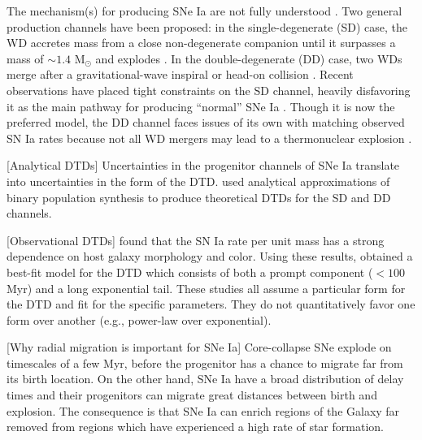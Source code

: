 \documentclass[modern,linenumbers]{aastex631}
\begin{document}
The mechanism(s) for producing SNe Ia are not fully understood \citep[for reviews, see][]{Maoz2014-Review,Livio2018-ProgenitorReview,Ruiter2020-ProgenitorReview}. Two general production channels have been proposed: in the single-degenerate (SD) case, the WD accretes mass from a close non-degenerate companion until it surpasses a mass of $\sim1.4$ M$_\odot$ and explodes \citep{Whelan1973-SDModel,Nomoto1982-SDModel,Yoon2003-SDModel}. In the double-degenerate (DD) case, two WDs merge after a gravitational-wave inspiral \citep{Iben1984-IaBinary,Webbink1984-DDModel,Pakmor2012-WDMerger} or head-on collision \citep{Benz1989-CollisionalDD,Thompson2011-CollisionalDD}. Recent observations have placed tight constraints on the SD channel, heavily disfavoring it as the main pathway for producing ``normal'' SNe Ia \citep[e.g.,][]{Panagia2006-RadioEmission,Schaefer2012-ExCompanionSNR,Chomiuk2016-RadioEmission,Fausnaugh2019-EarlyIaLightCurves,Tucker2020-SNeIaSpectra,Do2021-Progenitor1972E,Tucker2023-SN2011fe}. Though it is now the preferred model, the DD channel faces issues of its own with matching observed SN Ia rates because not all WD mergers may lead to a thermonuclear explosion \citep[e.g.,][]{Shen2012-DDMergers}.

[Analytical DTDs]
Uncertainties in the progenitor channels of SNe Ia translate into uncertainties in the form of the DTD. 
\citet{Greggio2005-AnalyticalRates} used analytical approximations of binary population synthesis to produce theoretical DTDs for the SD and DD channels.

[Observational DTDs]
\citet{Mannucci2005-SNRate} found that the SN Ia rate per unit mass has a strong dependence on host galaxy morphology and color. Using these results, \citet{Mannucci2006-TwoPopulations} obtained a best-fit model for the DTD which consists of both a prompt component ($<100$ Myr) and a long exponential tail. These studies all assume a particular form for the DTD and fit for the specific parameters. They do not quantitatively favor one form over another (e.g., power-law over exponential).

[Why radial migration is important for SNe Ia]
Core-collapse SNe explode on timescales of a few Myr, before the progenitor has a chance to migrate far from its birth location. On the other hand, SNe Ia have a broad distribution of delay times and their progenitors can migrate great distances between birth and explosion. The consequence is that SNe Ia can enrich regions of the Galaxy far removed from regions which have experienced a high rate of star formation.
\end{document}
